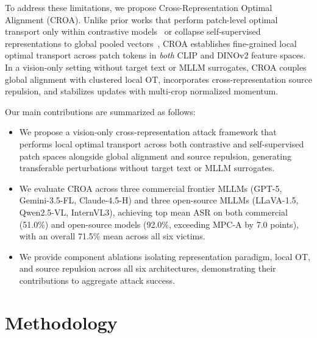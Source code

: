\documentclass{article}
\newcommand{\ours}{\textsc{CROA}}
\begin{document}
To address these limitations, we propose Cross-Representation
Optimal Alignment (\ours{}). Unlike prior works that perform patch-level
optimal transport only within contrastive models~\cite{foa} or collapse
self-supervised representations to global pooled vectors~\cite{mpcattack},
CROA establishes fine-grained local optimal transport across patch tokens
in \emph{both} CLIP and DINOv2 feature spaces. In a vision-only
setting without target text or MLLM surrogates, CROA couples
global alignment with clustered local OT, incorporates cross-representation
source repulsion, and stabilizes updates with multi-crop normalized momentum.

Our main contributions are summarized as follows:
\begin{itemize}
\item We propose a vision-only cross-representation attack framework
that performs local optimal transport across both contrastive and
self-supervised patch spaces alongside global alignment and source repulsion,
generating transferable perturbations without target text or MLLM surrogates.
\item We evaluate CROA across three commercial frontier MLLMs
(GPT-5, Gemini-3.5-FL, Claude-4.5-H) and three open-source MLLMs
(LLaVA-1.5, Qwen2.5-VL, InternVL3), achieving top mean ASR on both
commercial (51.0\%) and open-source models (92.0\%, exceeding
MPC-A by 7.0 points), with an overall 71.5\% mean across all six victims.
\item We provide component ablations isolating representation paradigm,
local OT, and source repulsion across all six architectures,
demonstrating their contributions to aggregate attack success.
\end{itemize}

\section{Methodology}
\end{document}
